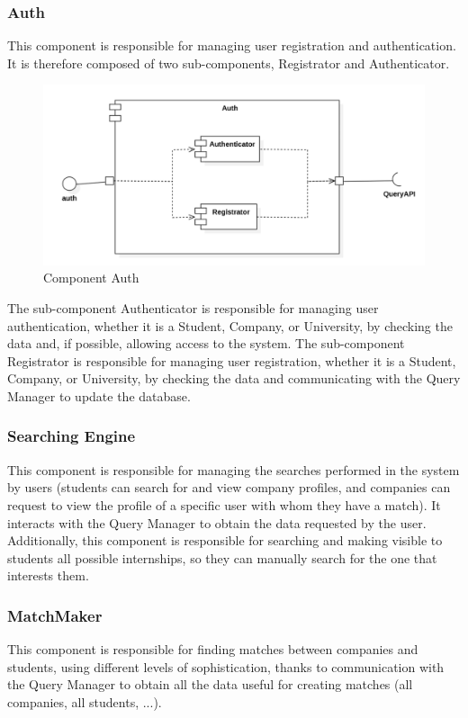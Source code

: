 \documentclass{article}
\begin{document}
\subsubsection{Auth}
This component is responsible for managing user registration and authentication. It is therefore composed of two sub-components, Registrator and Authenticator. 

\begin{figure}[H]
    \centering
    \includegraphics[width=1\linewidth]{AuthComponent.png}
    \caption{Component Auth}
    \label{fig:enter-label}
\end{figure}

The sub-component Authenticator is responsible for managing user authentication, whether it is a Student, Company, or University, by checking the data and, if possible, allowing access to the system. The sub-component Registrator is responsible for managing user registration, whether it is a Student, Company, or University, by checking the data and communicating with the Query Manager to update the database. 

\subsubsection{Searching Engine}
This component is responsible for managing the searches performed in the system by users (students can search for and view company profiles, and companies can request to view the profile of a specific user with whom they have a match). It interacts with the Query Manager to obtain the data requested by the user. Additionally, this component is responsible for searching and making visible to students all possible internships, so they can manually search for the one that interests them. 

\subsubsection{MatchMaker}
This component is responsible for finding matches between companies and students, using different levels of sophistication, thanks to communication with the Query Manager to obtain all the data useful for creating matches (all companies, all students, ...). 
\end{document}
